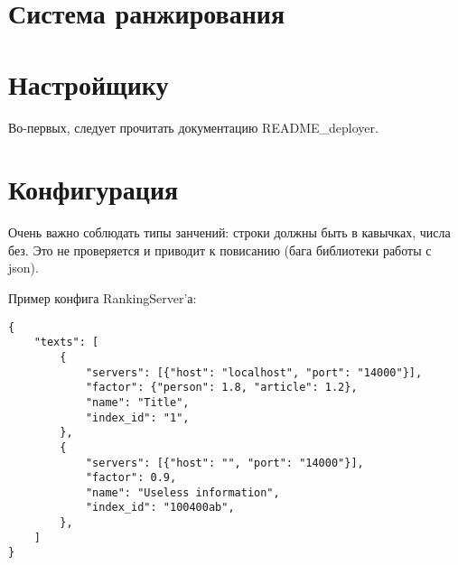\documentclass[12pt,a4paper]{article}
\begin{document}
\section{Система ранжирования}

\section{Настройщику}
Во-первых, следует прочитать документацию README\_deployer.

\section{Конфигурация}
Очень важно соблюдать типы занчений: строки должны быть в кавычках, числа без. Это не проверяется и приводит к повисанию (бага библиотеки работы с json).

Пример конфига RankingServer'а:
\begin{verbatim}
{
	"texts": [
		{
			"servers": [{"host": "localhost", "port": "14000"}],
			"factor": {"person": 1.8, "article": 1.2},
			"name": "Title",
			"index_id": "1",
		},
		{
			"servers": [{"host": "", "port": "14000"}],
			"factor": 0.9,
			"name": "Useless information",
			"index_id": "100400ab",
		},
	]
}
\end{verbatim}
\end{document}
